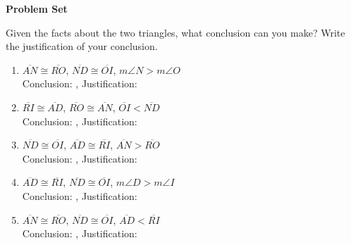 \def\figdir{/storage/emulated/0/Documents/documents/latex/1920/Grade-8/3rd/inequalities-in-two-triangles/f}

\textbf{Problem Set}

\vspce

Given the facts about the two triangles, what conclusion can you make? Write the justification of your conclusion.



\begin{enumerate}[label = \arabic*. ]
\item $\overline{AN} \cong \overline{RO}$, $\overline{ND} \cong \overline{OI}$, $m\angle{N} > m\angle{O}$ \\
Conclusion: \blank,  Justification: \blank 
\item $\overline{RI} \cong \overline{AD}$, $\overline{RO} \cong \overline{AN}$, $\overline{OI} < \overline{ND} $ \\
Conclusion: \blank,  Justification: \blank 
\item $\overline{ND} \cong \overline{OI}$, $\overline{AD} \cong \overline{RI}$, $\overline{AN} > \overline{RO} $ \\
Conclusion: \blank,  Justification: \blank 
\item $\overline{AD} \cong \overline{RI}$, $\overline{ND} \cong \overline{OI}$, $m\angle{D} > m\angle{I}$ \\
Conclusion: \blank,  Justification: \blank 
\item $\overline{AN} \cong \overline{RO}$, $\overline{ND} \cong \overline{OI}$, $\overline{AD} < \overline{RI} $ \\
Conclusion: \blank,  Justification: \blank 
\end{enumerate}  



